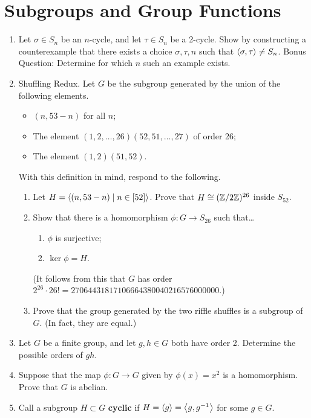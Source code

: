 \documentclass[../psets.tex]{subfiles}
\begin{document}
\section{Subgroups and Group Functions}
\begin{enumerate}
    \item {}Let $\sigma\in S_n$ be an $n$-cycle, and let $\tau\in S_n$ be a 2-cycle. Show by constructing a counterexample that there exists a choice $\sigma,\tau,n$ such that $\left\langle{\sigma,\tau}\right\rangle\neq S_n$. Bonus Question: Determine for which $n$ such an example exists.
    \item Shuffling Redux. Let $G$ be the subgroup generated by the union of the following elements.
    \begin{itemize}
        \item $(n,53-n)$ for all $n$;
        \item The element $(1,2,\dots,26)(52,51,\dots,27)$ of order 26;
        \item The element $(1,2)(51,52)$.
    \end{itemize}
    With this definition in mind, respond to the following.
    \begin{enumerate}
        \item Let $H=\left\langle{(n,53-n)\mid n\in[52]}\right\rangle$. Prove that $H\cong(\mathbb{Z}/2\mathbb{Z})^{26}$ inside $S_{52}$.
        \item Show that there is a homomorphism $\phi:G\to S_{26}$ such that\dots
        \begin{enumerate}
            \item $\phi$ is surjective;
            \item $\ker\phi=H$.
        \end{enumerate}
        (It follows from this that $G$ has order $2^{26}\cdot 26!=27064431817106664380040216576000000$.)
        \item Prove that the group generated by the two riffle shuffles is a subgroup of $G$. (In fact, they are equal.)
    \end{enumerate}
    \item Let $G$ be a finite group, and let $g,h\in G$ both have order 2. Determine the possible orders of $gh$.
    \item Suppose that the map $\phi:G\to G$ given by $\phi(x)=x^2$ is a homomorphism. Prove that $G$ is abelian.
    \item Call a subgroup $H\subset G$ \textbf{cyclic} if $H=\left\langle{g}\right\rangle=\left\langle{g,g^{-1}}\right\rangle$ for some $g\in G$.
    \begin{enumerate}

\end{enumerate}
\end{enumerate}
\end{document}
